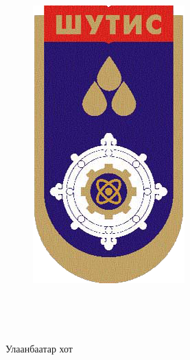 \pagecolor{Cover}
\begin{titlepage}
\begin{center}

{\scshape\LARGE \univname\par} %
{\scshape\Large \facname\par}\vspace{0.5cm} %

\begin{figure}[!htbp]
\centering
\includegraphics[scale=0.2]{Figures/MUST_logo.png}
\end{figure}

\vspace{1cm}
\hfill \large{\longname} \\

\vspace{1cm}

{\huge \bfseries \ttitle\par}\vspace{0.4cm} %

\vspace{3cm}
\textsc{\Large {\thesisname}}\\ %

\vfill

\large {Улаанбаатар хот} \\
 
\end{center}
\end{titlepage}
\pagecolor{white}

